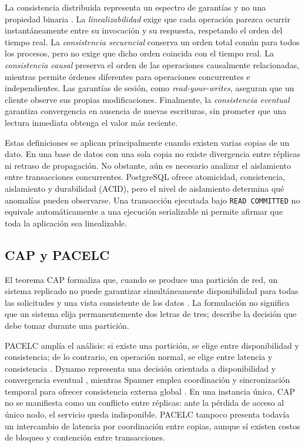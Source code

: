 \documentclass[11pt,a4paper]{article}
\begin{document}
La consistencia distribuida representa un espectro de garantías y no una propiedad binaria \cite{viotti2016consistency}. La \emph{linealizabilidad} exige que cada operación parezca ocurrir instantáneamente entre su invocación y su respuesta, respetando el orden del tiempo real. La \emph{consistencia secuencial} conserva un orden total común para todos los procesos, pero no exige que dicho orden coincida con el tiempo real. La \emph{consistencia causal} preserva el orden de las operaciones causalmente relacionadas, mientras permite órdenes diferentes para operaciones concurrentes e independientes. Las garantías de sesión, como \emph{read-your-writes}, aseguran que un cliente observe sus propias modificaciones. Finalmente, la \emph{consistencia eventual} garantiza convergencia en ausencia de nuevas escrituras, sin prometer que una lectura inmediata obtenga el valor más reciente.

Estas definiciones se aplican principalmente cuando existen varias copias de un dato. En una base de datos con una sola copia no existe divergencia entre réplicas ni retraso de propagación. No obstante, aún es necesario analizar el aislamiento entre transacciones concurrentes. PostgreSQL ofrece atomicidad, consistencia, aislamiento y durabilidad (ACID), pero el nivel de aislamiento determina qué anomalías pueden observarse. Una transacción ejecutada bajo \texttt{READ COMMITTED} no equivale automáticamente a una ejecución serializable ni permite afirmar que toda la aplicación sea linealizable.

\subsection{CAP y PACELC}

El teorema CAP formaliza que, cuando se produce una partición de red, un sistema replicado no puede garantizar simultáneamente disponibilidad para todas las solicitudes y una vista consistente de los datos \cite{gilbert2002brewer}. La formulación no significa que un sistema elija permanentemente dos letras de tres; describe la decisión que debe tomar durante una partición.

PACELC amplía el análisis: si existe una partición, se elige entre disponibilidad y consistencia; de lo contrario, en operación normal, se elige entre latencia y consistencia \cite{abadi2012pacelc}. Dynamo representa una decisión orientada a disponibilidad y convergencia eventual \cite{decandia2007dynamo}, mientras Spanner emplea coordinación y sincronización temporal para ofrecer consistencia externa global \cite{corbett2013spanner}. En una instancia única, CAP no se manifiesta como un conflicto entre réplicas: ante la pérdida de acceso al único nodo, el servicio queda indisponible. PACELC tampoco presenta todavía un intercambio de latencia por coordinación entre copias, aunque sí existen costos de bloqueo y contención entre transacciones.
\end{document}
